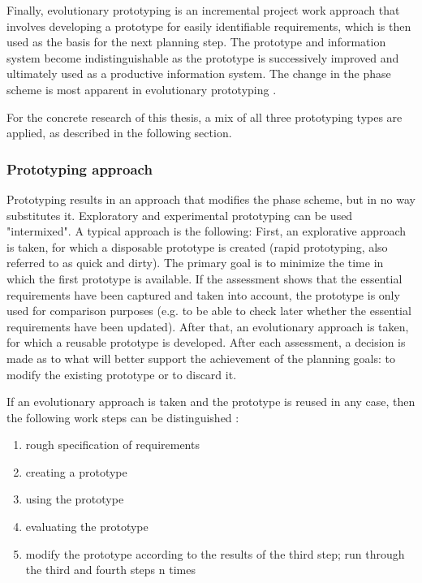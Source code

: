 Finally, evolutionary prototyping is an incremental project work approach that involves developing 
a prototype for easily identifiable requirements, which is then used as the basis for the next planning step. 
The prototype and information system become indistinguishable as the prototype is successively improved 
and ultimately used as a productive information system. 
The change in the phase scheme is most apparent in evolutionary prototyping
\autocite{riedlManagementInformatik2019}.

For the concrete research of this thesis,
a mix of all three prototyping types are applied,
as described in the following section.

\subsubsection*{Prototyping approach}

Prototyping results in an approach that modifies the phase scheme, but in no way substitutes it. Exploratory and experimental prototyping can be used "intermixed". A typical approach is the following: First, an explorative approach is taken, for which a disposable prototype is created (rapid prototyping, also referred to as quick and dirty). The primary goal is to minimize the time in which the first prototype is available. If the assessment shows that the essential requirements have been captured and taken into account, the prototype is only used for comparison purposes (e.g. to be able to check later whether the essential requirements have been updated). After that, an evolutionary approach is taken, for which a reusable prototype is developed. After each assessment, a decision is made as to what will better support the achievement of the planning goals: to modify the existing prototype or to discard it.

\newpage

If an evolutionary approach is taken and the prototype is reused in any case, then the following work steps can be distinguished
\autocite{riedlManagementInformatik2019}:

\begin{enumerate}
	\item rough specification of requirements
	\item creating a prototype
	\item using the prototype
	\item evaluating the prototype
	\item modify the prototype according to the results of the third step; run through the third and fourth steps n times
\end{enumerate}

